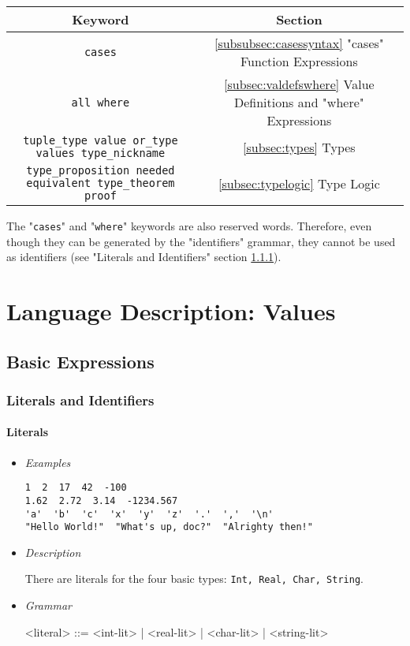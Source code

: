 \documentclass{article}
\begin{document}
\begin{center}
\begin{tabular}{ |c|c| } 
\hline
Keyword & Section
\\ 
\hline
\hline
\verb|cases| & \ref{subsubsec:casessyntax} "cases" Function Expressions
\\
\hline
\verb|all where| & \ref{subsec:valdefswhere}
Value Definitions and "where" Expressions
\\
\hline
\verb|tuple_type value or_type values type_nickname| &
\ref{subsec:types} Types
\\
\hline
\verb|type_proposition needed equivalent type_theorem proof| &
{\ref{subsec:typelogic} Type Logic}
\\
\hline
\end{tabular}
\end{center}
The "\verb|cases|" and "\verb|where|" keywords are also
reserved words. Therefore, even though they can be generated by the
"identifiers" grammar, they cannot be used as identifiers (see "Literals and
Identifiers" section \ref{subsubsec:litsandidents}).

\newpage
\section{Language Description: Values}

\subsection{Basic Expressions}

\subsubsection{Literals and Identifiers}
\label{subsubsec:litsandidents}

\paragraph{Literals}
\begin{itemize}

\item \textit{Examples}
\begin{verbatim}
1  2  17  42  -100
1.62  2.72  3.14  -1234.567
'a'  'b'  'c'  'x'  'y'  'z'  '.'  ','  '\n'
"Hello World!"  "What's up, doc?"  "Alrighty then!"
\end{verbatim}

\item \textit{Description}

There are literals for the four basic types: \texttt{Int, Real, Char, String}.

\item \textit{Grammar}
\begin{grammar}
<literal> ::= <int-lit> | <real-lit> | <char-lit> | <string-lit>
\end{grammar}

\end{itemize}
\end{document}
